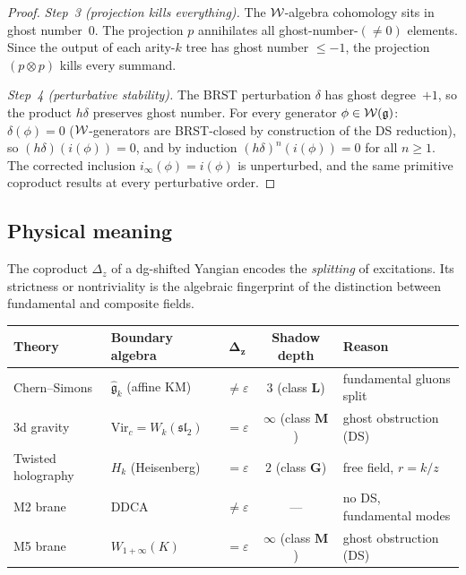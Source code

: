 \begin{proof}
\emph{Step~3 (projection kills everything).}
The $\mathcal{W}$-algebra cohomology sits in ghost number~$0$.
The projection $p$ annihilates all ghost-number-$(\neq 0)$ elements.
Since the output of each arity-$k$ tree has ghost number $\leq -1$,
the projection $(p \otimes p)$ kills every summand.

\emph{Step~4 (perturbative stability).}
The BRST perturbation $\delta$ has ghost degree~$+1$, so the
product $h\delta$ preserves ghost number. For every generator
$\phi \in \mathcal{W}(\mathfrak{g})$: $\delta(\phi) = 0$ ($\mathcal{W}$-generators are
BRST-closed by construction of the DS reduction), so
$(h\delta)(i(\phi)) = 0$, and by induction
$(h\delta)^n(i(\phi)) = 0$ for all $n \geq 1$. The corrected
inclusion $i_\infty(\phi) = i(\phi)$ is unperturbed, and the
same primitive coproduct results at every perturbative order.
\end{proof}


\subsection{Physical meaning}
\label{subsec:physical-meaning}

The coproduct $\Delta_z$ of a dg-shifted Yangian encodes the
\emph{splitting} of excitations. Its strictness or nontriviality
is the algebraic fingerprint of the distinction between fundamental
and composite fields.

\begin{center}
\small
\renewcommand{\arraystretch}{1.3}
\begin{tabular}{llccl}
\textbf{Theory}
& \textbf{Boundary algebra}
& $\boldsymbol{\Delta_z}$
& \textbf{Shadow depth}
& \textbf{Reason} \\
\hline
Chern--Simons &
 $\hat{\mathfrak{g}}_k$ (affine KM) &
 $\neq \varepsilon$ &
 $3$ (class $\mathbf{L}$) &
 fundamental gluons split \\[4pt]
3d gravity &
 $\mathrm{Vir}_c = W_k(\mathfrak{sl}_2)$ &
 $= \varepsilon$ &
 $\infty$ (class $\mathbf{M}$) &
 ghost obstruction (DS) \\[4pt]
Twisted holography &
 $H_k$ (Heisenberg) &
 $= \varepsilon$ &
 $2$ (class $\mathbf{G}$) &
 free field, $r = k/z$ \\[4pt]
M2 brane &
 DDCA &
 $\neq \varepsilon$ &
 --- &
 no DS, fundamental modes \\[4pt]
M5 brane &
 $W_{1+\infty}(K)$ &
 $= \varepsilon$ &
 $\infty$ (class $\mathbf{M}$) &
 ghost obstruction (DS) \\
\end{tabular}
\end{center}

